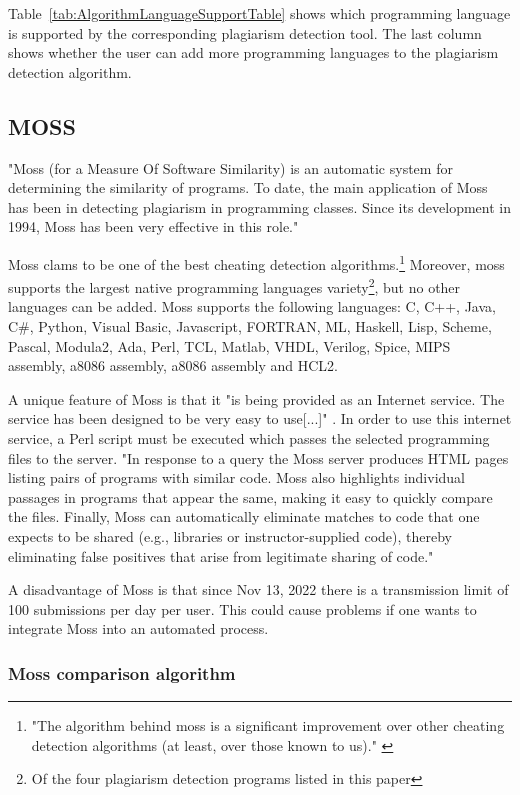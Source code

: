 \documentclass[a4paper, 11pt]{article}
\renewcommand{\\}{\vspace*{0.5\baselineskip} \newline}
\begin{document}
Table~\ref{tab:AlgorithmLanguageSupportTable} shows which programming language is supported by the corresponding plagiarism detection tool. The last column shows whether the user can add more programming languages to the plagiarism detection algorithm.

\subsection{MOSS}

"Moss (for a Measure Of Software Similarity) is an automatic system for determining the similarity of programs. To date, the main application of Moss has been in detecting plagiarism in programming classes. Since its development in 1994, Moss has been very effective in this role." \autocite{SMOSS}

Moss clams to be one of the best cheating detection algorithms.\footnote{"The algorithm behind moss is a significant improvement over other cheating detection algorithms (at least, over those known to us)." \autocite{SMOSS}} Moreover, moss supports the largest native programming languages variety\footnote{Of the four plagiarism detection programs listed in this paper}, but no other languages can be added. Moss supports the following languages: C, C++, Java, C\#, Python, Visual Basic, Javascript, FORTRAN, ML, Haskell, Lisp, Scheme, Pascal, Modula2, Ada, Perl, TCL, Matlab, VHDL, Verilog, Spice, MIPS assembly, a8086 assembly, a8086 assembly and HCL2.

A unique feature of Moss is that it "is being provided as an Internet service. The service has been designed to be very easy to use[...]" \autocite{SMOSS}. In order to use this internet service, a Perl script must be executed which passes the selected programming files to the server. "In response to a query the Moss server produces HTML pages listing pairs of programs with similar code. Moss also highlights individual passages in programs that appear the same, making it easy to quickly compare the files. Finally, Moss can automatically eliminate matches to code that one expects to be shared (e.g., libraries or instructor-supplied code), thereby eliminating false positives that arise from legitimate sharing of code." \autocite{SMOSS}

A disadvantage of Moss is that since Nov 13, 2022 there is a transmission limit of 100 submissions per day per user. This could cause problems if one wants to integrate Moss into an automated process.

\subsubsection{Moss comparison algorithm}
\end{document}
